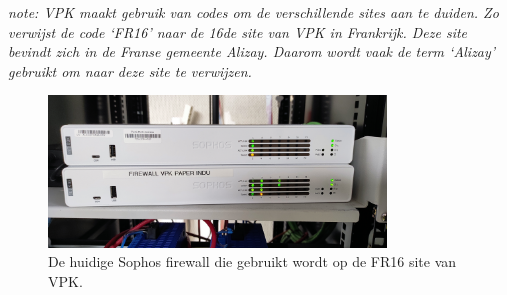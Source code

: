 \textit{note: VPK maakt gebruik van codes om de verschillende sites aan te duiden. Zo verwijst de code ‘FR16’ naar de 16de site van VPK in Frankrijk. Deze site bevindt zich in de Franse gemeente Alizay. Daarom wordt vaak de term ‘Alizay’ gebruikt om naar deze site te verwijzen.}

\begin{figure}[H]
    \centering
    \includegraphics[width=0.8\textwidth]{fotos/SophosFirewall.jpg}
    \caption[Sophos Firewall]{\label{fig:grail}De huidige Sophos firewall die gebruikt wordt op de FR16 site van VPK.}
\end{figure} 

